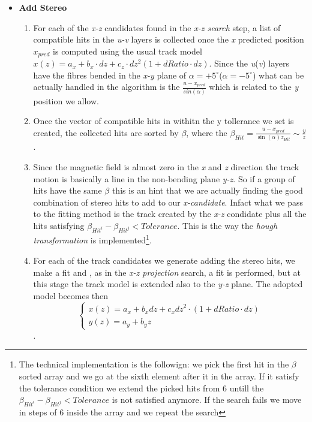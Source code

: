 \documentclass[paper=a4, fontsize=10pt]{scrartcl}
\numberwithin{equation}{section}		%
\numberwithin{figure}{section}			%
\numberwithin{table}{section}				%
\begin{document}
\begin{itemize}
\begin{enumerate}
   \end{enumerate}
 \item{\textbf{Add Stereo}}
  \begin{enumerate}
   \item{For each of the \textit{x-z} candidates found in the \textit{x-z search} step, a list of compatible hits in the \textit{u-v} layers is collected once the \textit{x} predicted position $x_{pred}$ is computed using the usual track model $x(z)=a_x + b_x \cdot dz +c_z \cdot dz^{2}\left( 1+dRatio \cdot dz \right)$. Since the \textit{u}(\textit{v}) layers have the fibres bended in the \textit{x-y} plane of $\alpha = +5^{\circ}$($\alpha = -5^{\circ}$) what can be actually handled in the algorithm is the $\frac{u - x_{pred}}{sin(\alpha)}$ which is related to the \textit{y} position we allow.}
   \item{Once the vector of compatible hits in withitn the y tollerance we set is created, the collected hits are sorted by $\beta$, where the $\beta_{Hit}=\frac{u-x_{pred}}{\sin(\alpha)z_{Hit}}\sim \frac{y}{z}$.}
   \item{Since the magnetic field is almost zero in the \textit{x} and \textit{z} direction the track motion is basically a line in the non-bending plane \textit{y-z}. So if a group of hits have the same $\beta$ this is an hint that we are actually finding the good combination of stereo hits to add to our \textit{x-candidate}. Infact what we pass to the fitting method is the track created by the \textit{x-z} condidate plus all the hits satisfying $\beta_{Hit^{i}}-\beta_{Hit^{j}}<Tolerance$. This is the way the \textit{hough transformation} is implemented\footnote{The technical implementation is the followign: we pick the first hit in the $\beta$ sorted array and we go at the sixth element after it in the array. If it satisfy the tolerance condition we extend the picked hits from 6 untill the $\beta_{Hit^{i}}-\beta_{Hit^{j}}<Tolerance$ is not satisfied anymore. If the search fails we move in steps of 6 inside the array and we repeat the search}.}
   \item{For each of the track candidates we generate adding the stereo hits, we make a fit and , as in the \textit{x-z projection} search, a fit is performed, but at this stage the track model is extended also to the \textit{y-z} plane. The adopted model becomes then $$\begin{cases} x(z)={ a }_{ x }+b_{ x }dz+{ c }_{ x }{ dz }^{ 2 }\cdot (1+dRatio\cdot dz) \\ y(z)={ a }_{ y }+{ b }_{ y }z \end{cases}$$.}

\end{enumerate}
\end{itemize}
\end{document}
